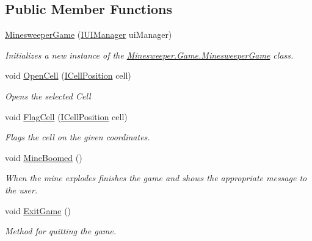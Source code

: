\subsection*{Public Member Functions}
\begin{DoxyCompactItemize}
\item 
\hyperlink{class_minesweeper_1_1_game_1_1_minesweeper_game_a116b494ade82eea0125efb4541f22b23}{Minesweeper\+Game} (\hyperlink{interface_minesweeper_1_1_game_1_1_i_u_i_manager}{I\+U\+I\+Manager} ui\+Manager)
\begin{DoxyCompactList}\small\item\em Initializes a new instance of the \hyperlink{class_minesweeper_1_1_game_1_1_minesweeper_game}{Minesweeper.\+Game.\+Minesweeper\+Game} class. \end{DoxyCompactList}\item 
void \hyperlink{class_minesweeper_1_1_game_1_1_minesweeper_game_ab5b0c6535ef107b31e141fa6462f9b4c}{Open\+Cell} (\hyperlink{interface_minesweeper_1_1_lib_1_1_i_cell_position}{I\+Cell\+Position} cell)
\begin{DoxyCompactList}\small\item\em Opens the selected Cell \end{DoxyCompactList}\item 
void \hyperlink{class_minesweeper_1_1_game_1_1_minesweeper_game_a5c45da023c4d58c4c5cfc78336012b02}{Flag\+Cell} (\hyperlink{interface_minesweeper_1_1_lib_1_1_i_cell_position}{I\+Cell\+Position} cell)
\begin{DoxyCompactList}\small\item\em Flags the cell on the given coordinates. \end{DoxyCompactList}\item 
void \hyperlink{class_minesweeper_1_1_game_1_1_minesweeper_game_a53e6276fccb916310cece3d6ab9b3306}{Mine\+Boomed} ()
\begin{DoxyCompactList}\small\item\em When the mine explodes finishes the game and shows the appropriate message to the user. \end{DoxyCompactList}\item 
void \hyperlink{class_minesweeper_1_1_game_1_1_minesweeper_game_afb4bac8d31b4477b70e9618e9d28a621}{Exit\+Game} ()
\begin{DoxyCompactList}\small\item\em Method for quitting the game. \end{DoxyCompactList}\item 

\end{DoxyCompactItemize}
